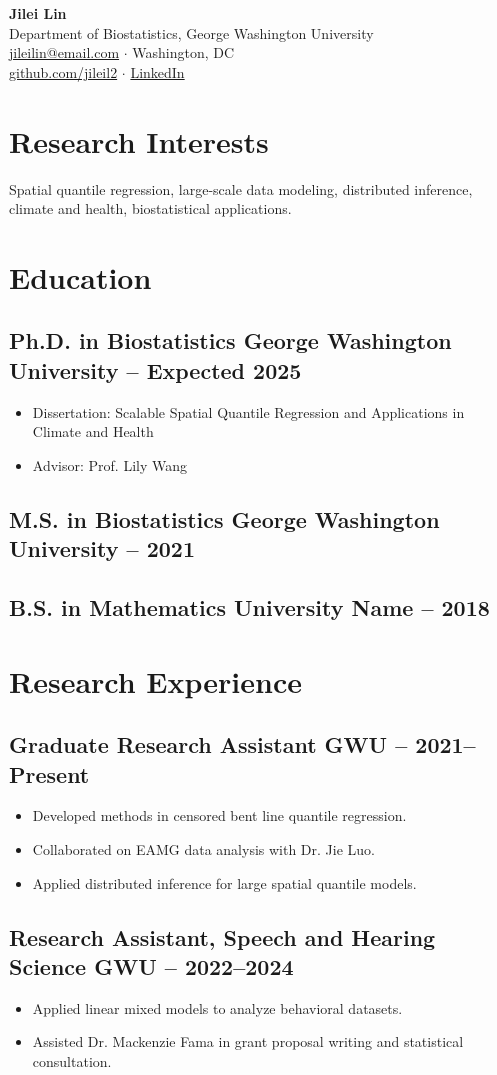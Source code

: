 \documentclass[11pt]{article}
\newcommand{\datedsubsection}[3]{
  \subsection*{#1 \hfill {\small #2 -- #3}}
}
\begin{document}
\begin{center}
  {\LARGE \textbf{Jilei Lin}} \\[4pt]
  Department of Biostatistics, George Washington University \\
  \href{mailto:jileilin@email.com}{jileilin@email.com} $\cdot$ Washington, DC\\
  \href{https://github.com/jileil2}{github.com/jileil2} $\cdot$ \href{https://www.linkedin.com/in/jileilin}{LinkedIn}
\end{center}

\section*{Research Interests}
Spatial quantile regression, large-scale data modeling, distributed inference, climate and health, biostatistical applications.

\section*{Education}
\datedsubsection{Ph.D. in Biostatistics}{George Washington University}{Expected 2025}
\begin{itemize}[leftmargin=*]
  \item Dissertation: Scalable Spatial Quantile Regression and Applications in Climate and Health
  \item Advisor: Prof. Lily Wang
\end{itemize}

\datedsubsection{M.S. in Biostatistics}{George Washington University}{2021}
\datedsubsection{B.S. in Mathematics}{University Name}{2018}

\section*{Research Experience}
\datedsubsection{Graduate Research Assistant}{GWU}{2021--Present}
\begin{itemize}[leftmargin=*]
  \item Developed methods in censored bent line quantile regression.
  \item Collaborated on EAMG data analysis with Dr. Jie Luo.
  \item Applied distributed inference for large spatial quantile models.
\end{itemize}

\datedsubsection{Research Assistant, Speech and Hearing Science}{GWU}{2022--2024}
\begin{itemize}[leftmargin=*]
  \item Applied linear mixed models to analyze behavioral datasets.
  \item Assisted Dr. Mackenzie Fama in grant proposal writing and statistical consultation.
\end{itemize}
\end{document}
